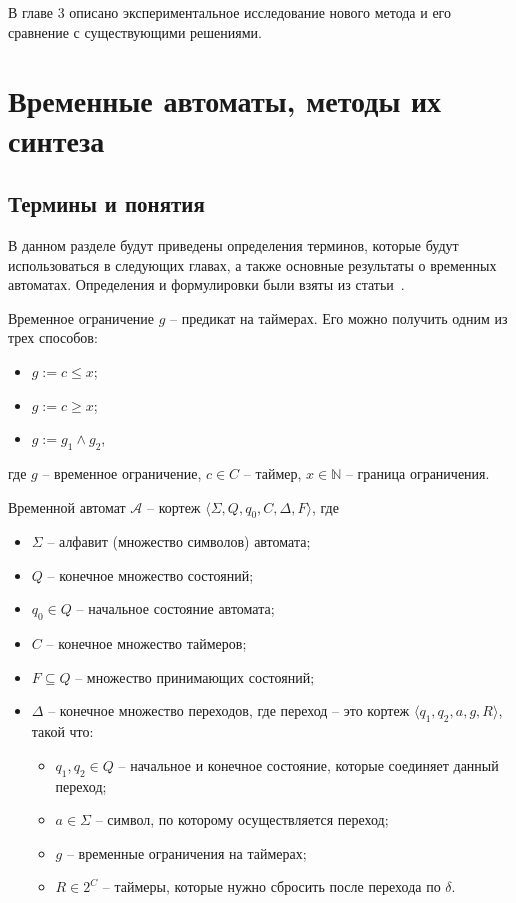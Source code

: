 \documentclass[times,specification,annotation]{itmo-student-thesis}
\begin{document}
В главе 3 описано экспериментальное исследование нового метода и его сравнение с существующими решениями.

\chapter{Временные автоматы, методы их синтеза}
\startrelatedwork

\section{Термины и понятия}
В данном разделе будут приведены определения терминов, которые будут использоваться в следующих главах, а также основные результаты о временных автоматах.
Определения и формулировки были взяты из статьи~\cite{1-dta}.

\begin{definition}
  Временное ограничение $g$ -- предикат на таймерах. Его можно получить одним из трех способов:
  \begin{itemize}
    \item $g := c \leq x$;
    \item $g := c \geq x$;
    \item $g := g_1 \land g_2$,
  \end{itemize}
  где $g$ -- временное ограничение, $c \in C$ -- таймер, $x \in \mathbb{N}$ -- граница ограничения.
\end{definition}

\begin{definition}
  Временной автомат $\mathcal{A}$ -- кортеж $\langle \Sigma, Q, q_0, C, \Delta, F \rangle$, где
  \begin{itemize}
    \item $\Sigma$ -- алфавит (множество символов) автомата;
    \item $Q$ -- конечное множество состояний;
    \item $q_0 \in Q$ -- начальное состояние автомата;
    \item $C$ -- конечное множество таймеров;
    \item $F \subseteq Q$ -- множество принимающих состояний;
    \item $\Delta$ -- конечное множество переходов, где переход -- это кортеж $\langle q_1, q_2, a, g, R \rangle$, такой что:
    \begin{itemize}
      \item $q_1, q_2 \in Q$ -- начальное и конечное состояние, которые соединяет данный переход;
      \item $a \in \Sigma$ -- символ, по которому осуществляется переход;
      \item $g$ -- временные ограничения на таймерах;
      \item $R \in 2^{C}$ -- таймеры, которые нужно сбросить после перехода по $\delta$.
    \end{itemize}
  \end{itemize}
  \label{timed-automaton}
\end{definition}
\end{document}
